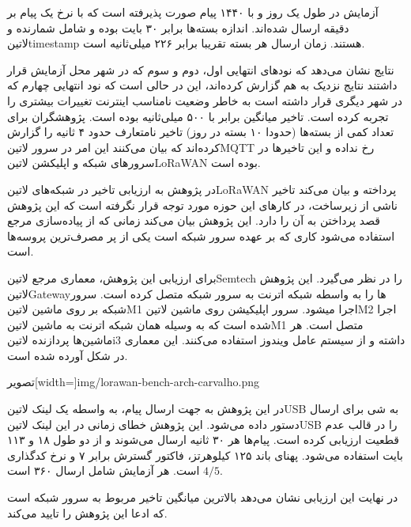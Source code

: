 آزمایش در طول یک روز و با ۱۴۴۰ پیام صورت پذیرفته است که با نرخ یک پیام بر دقیقه ارسال شده‌اند.
اندازه بسته‌ها برابر ۳۰ بایت بوده و شامل شمارنده و ‌لاتین{timestamp} هستند.
زمان ارسال هر بسته تقریبا برابر ۲۲۶ میلی‌ثانیه است.

نتایج نشان می‌دهد که نودهای انتهایی اول، دوم و سوم که در شهر محل آزمایش قرار داشتند نتایج نزدیک به هم گزارش کرده‌اند، این در حالی است که نود انتهایی چهارم
که در شهر دیگری قرار داشته است به خاطر وضعیت نامناسب اینترنت تغییرات بیشتری را تجربه کرده است.
تاخیر میانگین برابر با ۵۰۰ میلی‌ثانیه بوده است.
پژوهشگران برای تعداد کمی از بسته‌ها (حدودا ۱۰ بسته در روز) تاخیر نامتعارف حدود ۴ ثانیه را گزارش کرده‌اند که بیان می‌کنند این امر در سرور ‌لاتین{MQTT}
رخ نداده و این تاخیرها در سرورهای شبکه و اپلیکشن ‌لاتین{LoRaWAN} بوده است.


در پژوهش  به ارزیابی تاخیر در شبکه‌های ‌لاتین{LoRaWAN} پرداخته و بیان می‌کند تاخیر ناشی از زیرساخت، در کارهای این حوزه مورد توجه قرار نگرفته است
که این پژوهش قصد پرداختن به آن را دارد.
این پژوهش بیان می‌کند زمانی که از پیاده‌سازی مرجع استفاده می‌شود کاری که بر عهده سرور شبکه است یکی از پر مصرف‌ترین پروسه‌ها است.

برای ارزیابی این پژوهش، معماری مرجع ‌لاتین{Semtech} را در نظر می‌گیرد. این پژوهش ‌لاتین{Gateway}ها را به واسطه شبکه اترنت به سرور شبکه متصل کرده است.
سرور شبکه بر روی ماشین ‌لاتین{M1} اجرا میشود. سرور اپلیکیشن روی ماشین ‌لاتین{M2} اجرا شده است که به وسیله همان شبکه اترنت به ماشین ‌لاتین{M1}
متصل است. هر ماشین‌ها پردازنده ‌لاتین{i3} داشته و از سیستم عامل ویندوز استفاده می‌کنند.
این معماری در شکل 
آورده شده است.

‌تصویر[width=\textwidth]{img/lorawan-bench-arch-carvalho.png}

در این پژوهش به جهت ارسال پیام، به واسطه یک لینک ‌لاتین{USB} به شی برای ارسال دستور داده می‌شود. این پژوهش خطای زمانی
در این لینک ‌لاتین{USB} را در قالب عدم قطعیت ارزیابی کرده است. پیام‌ها هر ۳۰ ثانیه ارسال می‌شوند و از دو طول ۱۸ و ۱۱۳ بایت استفاده می‌شود.
پهنای باند ۱۲۵ کیلوهرتز، فاکتور گسترش برابر ۷ و نرخ کدگذاری $4/5$ است.
هر آزمایش شامل ارسال ۳۶۰ است.

در نهایت این ارزیابی نشان می‌دهد بالاترین میانگین تاخیر مربوط به سرور شبکه است که ادعا این پژوهش را تایید می‌کند.

